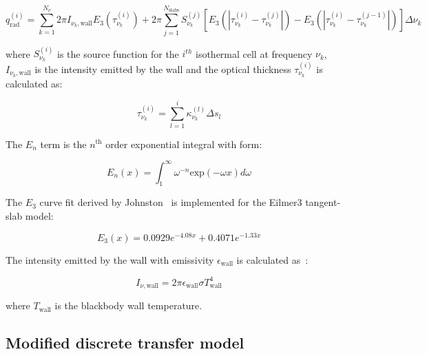 \begin{equation}
 q_\text{rad}^{(i)} = \sum_{k=1}^{N_\nu} 2 \pi I_{\nu_k, \text{wall}} E_{3} \left ( \tau_{\nu_k}^{(i)} \right ) + 2 \pi \sum_{j=1}^{N_{\text{slabs}}} S_{\nu_k}^{(j)} \left [ E_{3} \left ( \left  | \tau_{\nu_k}^{(i)} - \tau_{\nu_k}^{(j)} \right  | \right ) - E_{3} \left ( \left  | \tau_{\nu_k}^{(i)} - \tau_{\nu_k}^{(j-1)} \right  | \right ) \right ] \Delta \nu_k
 \label{eq:TS_modest}
\end{equation}

\noindent where $S_{\nu_k}^{(i)}$ is the source function for the $i^{th}$ isothermal cell at frequency $\nu_k$, $I_{\nu_k, \text{wall}}$ is the intensity emitted by the wall and the optical thickness $\tau_{\nu_k}^{(i)}$ is calculated as:

\begin{equation}
 \tau_{\nu_k}^{(i)} = \sum_{l=1}^{i} \kappa_{\nu_k}^{(l)} \Delta s_{l}
 \label{eq:tau_nu}
\end{equation}

\noindent The $E_{n}$ term is the $n^\text{th}$ order exponential integral with form:

\begin{equation}
 E_{n} ( x ) = \int_{1}^{\infty} \omega^{-n} \text{exp} \left ( - \omega x \right ) d \omega
 \label{eq:E_n}
\end{equation}

\noindent The $E_{3}$ curve fit derived  by Johnston~\cite{JohnPhd} is implemented for the Eilmer3  tangent-slab model:

\begin{equation}
 E_{3} ( x ) = 0.0929 e^{-4.08x} + 0.4071e^{-1.33x}
 \label{eq:E3}
\end{equation}

\noindent The intensity emitted by the wall with emissivity $\epsilon_{\text{wall}}$ is calculated as~\cite{VK65}:

\begin{equation}
 I_{\nu, \text{wall}} = 2 \pi \epsilon_{\text{wall}} \sigma T_{\text{wall}}^{4}
 \label{eq:qwall}
\end{equation}

\noindent where $T_{\text{wall}}$ is the blackbody wall temperature.  

\subsection{Modified discrete transfer model}
\label{sec:discrete_transfer}

